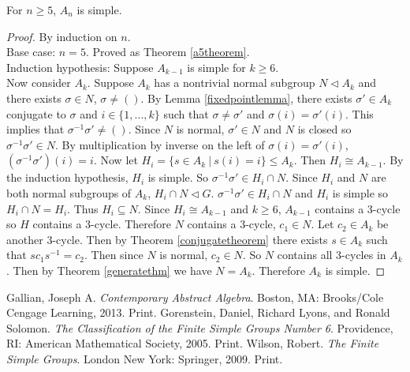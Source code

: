 \documentclass[a4paper]{article}
\begin{document}
\begin{theorem}
For $n \ge 5$, $A_n$ is simple.
\end{theorem}
\begin{proof}
By induction on $n$. \\
Base case: $n = 5$. Proved as Theorem \ref{a5theorem}. \\
Induction hypothesis: Suppose $A_{k-1}$ is simple for $k \ge 6$. \\
Now consider $A_k$. Suppose $A_k$ has a nontrivial normal subgroup $N \triangleleft A_k$ and there exists $\sigma \in N$, $\sigma \ne ()$. By Lemma \ref{fixedpointlemma}, there exists $\sigma' \in A_k$ conjugate to $\sigma$ and $i \in \{1, ..., k\}$ such that $\sigma \ne \sigma'$ and $\sigma(i) = \sigma'(i)$. This implies that $\sigma^{-1} \sigma' \ne ()$. Since $N$ is normal, $\sigma' \in N$ and $N$ is closed so $\sigma^{-1} \sigma' \in N$. By multiplication by inverse on the left of $\sigma(i) = \sigma'(i)$, $(\sigma^{-1} \sigma')(i) = i$. Now let $H_i = \{s \in A_k\ |\ s(i) = i\} \le A_k$. Then $H_i \cong A_{k-1}$. By the induction hypothesis, $H_i$ is simple. So $\sigma^{-1} \sigma' \in H_i \cap N$. Since $H_i$ and $N$ are both normal subgroups of $A_k$, $H_i \cap N \triangleleft G$. $\sigma^{-1} \sigma' \in H_i \cap N$ and $H_i$ is simple so $H_i \cap N = H_i$. Thus $H_i \subseteq N$. Since $H_i \cong A_{k-1}$ and $k \ge 6$, $A_{k-1}$ contains a 3-cycle so $H$ contains a 3-cycle. Therefore $N$ contains a 3-cycle, $c_1 \in N$. Let $c_2 \in A_k$ be another 3-cycle. Then by Theorem \ref{conjugatetheorem} there exists $s \in A_k$ such that $s c_1 s^{-1} = c_2$. Then since $N$ is normal, $c_2 \in N$. So $N$ contains all 3-cycles in $A_k$. Then by Theorem \ref{generatethm} we have $N=A_k$. Therefore $A_k$ is simple.
\end{proof}


\begin{thebibliography}{9}
  Gallian, Joseph A. \emph{Contemporary Abstract Algebra}. Boston, MA: Brooks/Cole Cengage Learning, 2013. Print.
  Gorenstein, Daniel, Richard Lyons, and Ronald Solomon. \emph{The Classification of the Finite Simple Groups Number 6}. Providence, RI: American Mathematical Society, 2005. Print.
  Wilson, Robert. \emph{The Finite Simple Groups}. London New York: Springer, 2009. Print.

\end{thebibliography}
\end{document}
